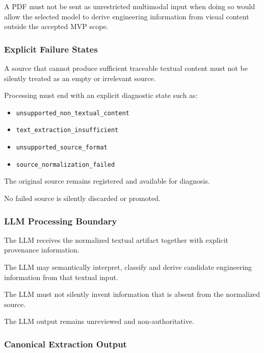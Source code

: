 A PDF must not be sent as unrestricted multimodal input when doing so would allow the selected model to derive engineering information from visual content outside the accepted MVP scope.

\hypertarget{explicit-failure-states}{%
\subsubsection{Explicit Failure States}\label{explicit-failure-states}}

A source that cannot produce sufficient traceable textual content must not be silently treated as an empty or irrelevant source.

Processing must end with an explicit diagnostic state such as:

\begin{itemize}
\tightlist
\item
  \texttt{unsupported\_non\_textual\_content}
\item
  \texttt{text\_extraction\_insufficient}
\item
  \texttt{unsupported\_source\_format}
\item
  \texttt{source\_normalization\_failed}
\end{itemize}

The original source remains registered and available for diagnosis.

No failed source is silently discarded or promoted.

\hypertarget{llm-processing-boundary}{%
\subsubsection{LLM Processing Boundary}\label{llm-processing-boundary}}

The LLM receives the normalized textual artifact together with explicit provenance information.

The LLM may semantically interpret, classify and derive candidate engineering information from that textual input.

The LLM must not silently invent information that is absent from the normalized source.

The LLM output remains unreviewed and non-authoritative.

\hypertarget{canonical-extraction-output}{%
\subsubsection{Canonical Extraction Output}\label{canonical-extraction-output}}

